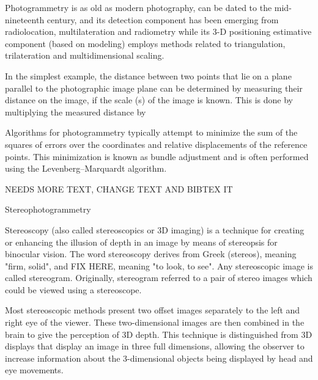 Photogrammetry is as old as modern photography, can be dated to the mid-nineteenth century, and its detection component has been emerging from radiolocation, multilateration and radiometry while its 3-D positioning estimative component (based on modeling) employs methods related to triangulation, trilateration and multidimensional scaling.

In the simplest example, the distance between two points that lie on a plane parallel to the photographic image plane can be determined by measuring their distance on the image, if the scale (s) of the image is known. This is done by multiplying the measured distance by %

Algorithms for photogrammetry typically attempt to minimize the sum of the squares of errors over the coordinates and relative displacements of the reference points. This minimization is known as bundle adjustment and is often performed using the Levenberg–Marquardt algorithm.

NEEDS MORE TEXT, CHANGE TEXT AND BIBTEX IT

Stereophotogrammetry

Stereoscopy (also called stereoscopics or 3D imaging) is a technique for creating or enhancing the illusion of depth in an image by means of stereopsis for binocular vision. The word stereoscopy derives from Greek (stereos), meaning "firm, solid", and FIX HERE, meaning "to look, to see". Any stereoscopic image is called stereogram. Originally, stereogram referred to a pair of stereo images which could be viewed using a stereoscope.

Most stereoscopic methods present two offset images separately to the left and right eye of the viewer. These two-dimensional images are then combined in the brain to give the perception of 3D depth. This technique is distinguished from 3D displays that display an image in three full dimensions, allowing the observer to increase information about the 3-dimensional objects being displayed by head and eye movements.










